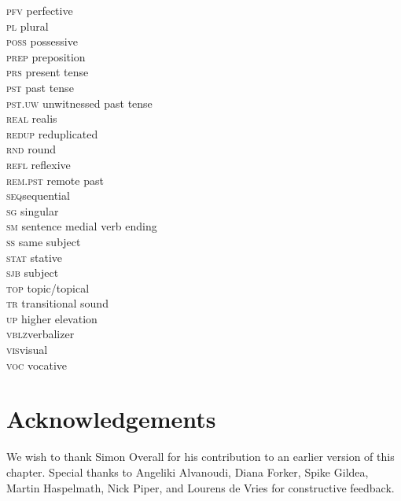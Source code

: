 \documentclass[output=paper]{LSP/langsci}
\begin{document}
\begin{tabbing}
\textsc{pfv} \> perfective \\
\textsc{pl} \> plural \\
\textsc{poss} \> possessive \\
\textsc{prep} \> preposition \\
\textsc{prs} \> present tense \\
\textsc{pst} \> past tense \\
\textsc{pst.uw} \> unwitnessed past tense \\
\textsc{real} \> realis \\
\textsc{redup} \> reduplicated \\
\textsc{rnd} \> round \\
\textsc{refl} \> reflexive \\
\textsc{rem.pst} \> remote past \\
\textsc{seq}\>sequential \\
\textsc{sg} \> singular \\
\textsc{sm} \> sentence medial verb ending \\
\textsc{ss} \> same subject \\
\textsc{stat} \> stative \\
\textsc{sjb} \> subject \\
\textsc{top} \> topic\slash topical \\
\textsc{tr} \> transitional sound \\
\textsc{up} \> higher elevation \\
\textsc{vblz}\>verbalizer \\
\textsc{vis}\>visual \\
\textsc{voc} \> vocative
\end{tabbing}

\section*{Acknowledgements}
We wish to thank Simon Overall for his contribution to an earlier version of this chapter. Special thanks to Angeliki Alvanoudi, Diana Forker, Spike Gildea, Martin Haspelmath, Nick Piper, and Lourens de Vries for constructive feedback. 

\sloppy
\printbibliography[heading=subbibliography,notkeyword=this] 
\end{document}
